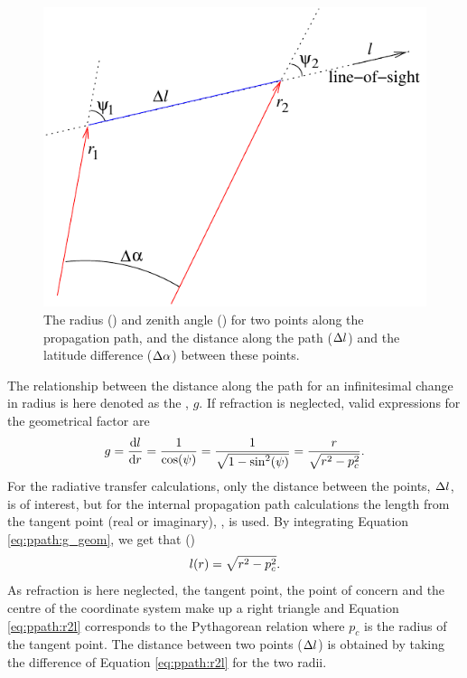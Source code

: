 \begin{figure}
 \begin{center}
  \begin{minipage}[c]{0.65\textwidth}
   \begin{center}
    \includegraphics*[width=0.9\hsize]{geom1d}
   \end{center}
  \end{minipage}%
  \begin{minipage}[c]{0.35\textwidth}
   \caption{The radius (\Rds) and zenith angle (\ZntAng) for two points along
     the propagation path, and the distance along the path ($\Delta l$)
     and the latitude difference ($\Delta\alpha$) between these points.}
   \label{fig:ppath:1d2dgeom}
  \end{minipage}
 \end{center}
\end{figure}   

The relationship between the distance along the path for an
infinitesimal change in radius is here denoted as the
, $g$. If refraction is neglected, valid
expressions for the geometrical factor are
\begin{equation}
  g = \frac{\mathrm{d} l}{\mathrm{d} r} 
           = \frac{1}{\cos(\psi)} = \frac{1}{\sqrt{1-\sin^2(\psi)}}
                                            = \frac{r}{\sqrt{r^2-p_c^2}}.
  \label{eq:ppath:g_geom}
\end{equation}
For the radiative transfer calculations, only the distance between the
points, $\Delta l$, is of interest, but for the internal
propagation path calculations the length from the tangent point (real
or imaginary), \PpathLng, is used. By integrating
Equation \ref{eq:ppath:g_geom}, we get that
()
\begin{equation}
  l(r) = \sqrt{r^2-p_c^2}.
  \label{eq:ppath:r2l}
\end{equation}
As refraction is here neglected, the tangent point, the point of
concern and the centre of the coordinate system make up a right
triangle and Equation \ref{eq:ppath:r2l} corresponds to the
Pythagorean relation where $p_c$ is the radius of the tangent point.
The distance between two points ($\Delta l$) is obtained by
taking the difference of Equation \ref{eq:ppath:r2l} for the two
radii.

